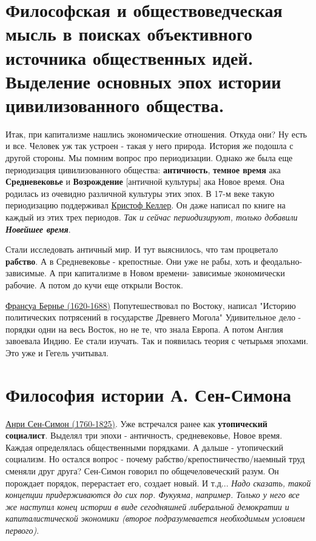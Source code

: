 \section{Философская и обществоведческая мысль в поисках объективного источника общественных идей. Выделение основных эпох истории цивилизованного общества.}
Итак, при капитализме нашлись экономические отношения. Откуда они? Ну есть и все. Человек уж так устроен - такая у него природа. История же подошла с другой стороны. Мы помним вопрос про периодизации. Однако же была еще периодизация цивилизованного общества: \textbf{античность}, \textbf{темное время} ака \textbf{Средневековье} и \textbf{Возрождение} [античной культуры] ака Новое время. Она родилась из очевидно различной культуры этих эпох. В 17-м веке такую периодизацию поддерживал \underline{Кристоф Келлер}. Он даже написал по книге на каждый из этих трех периодов. \textit{Так и сейчас периодизируют, только добавили \textbf{Новейшее время}}.

Стали исследовать античный мир. И тут выяснилось, что там процветало \textbf{рабство}. А в Средневековье - крепостные. Они уже не рабы, хоть и феодально-зависимые. А при капитализме в Новом времени- зависимые экономически рабочие. А потом до кучи еще открыли Восток. 

\underline{Франсуа Бернье (1620-1688)} Попутешествовал по Востоку, написал "Историю политических потрясений в государстве Древнего Могола" Удивительное дело - порядки одни на весь Восток, но не те, что знала Европа. А потом Англия завоевала Индию. Ее стали изучать. Так и появилась теория с четырьмя эпохами. Это уже и Гегель учитывал.

\section{Философия истории А. Сен-Симона}
\underline{Анри Сен-Симон (1760-1825)}. Уже встречался ранее как \textbf{утопический социалист}. Выделял три эпохи - античность, средневековье, Новое время. Каждая определялась общественными порядками. А дальше - утопический социализм. Но остался вопрос - почему рабство/крепостничество/наемный труд сменяли друг друга? Сен-Симон говорил по общечеловеческий разум. Он порождает порядок, перерастает его, создает новый. И т.д... \textit{Надо сказать, такой концепции придерживаются до сих пор. Фукуяма, например. Только у него все же наступил конец истории в виде сегодняшней либеральной демократии и капиталистической экономики (второе подразумевается необходимым условием первого)}.

